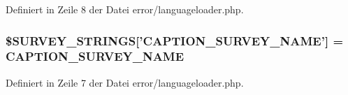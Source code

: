 Definiert in Zeile 8 der Datei error/languageloader.php.
\subsubsection{\setlength{\rightskip}{0pt plus 5cm}\$SURVEY\_\-STRINGS['{\bf CAPTION\_\-SURVEY\_\-NAME}'] = {\bf CAPTION\_\-SURVEY\_\-NAME}}\label{error_2languageloader_8php_200a4672901410f4d467737a2070d4d8}




Definiert in Zeile 7 der Datei error/languageloader.php.